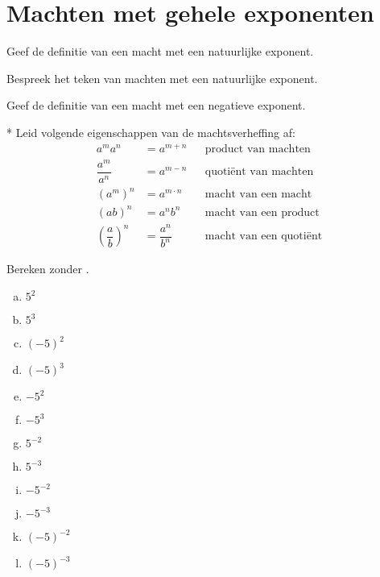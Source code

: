 \documentclass[12pt,twoside]{article}
\begin{document}
\begin{theorie}
  \thispagestyle{empty}
  \mbox{}
  \newpage
  \clearpage
  \thispagestyle{empty}
  \tableofcontents
  \newpage
  \clearpage

  \fancyhead[RE,LO]{}

\end{theorie}

\section{Machten met gehele exponenten}

\begin{oefening}
Geef de definitie van een macht met een natuurlijke exponent.
\end{oefening}

\begin{oefening}
Bespreek het teken van machten met een natuurlijke exponent.
\end{oefening}

\begin{oefening}
Geef de definitie van een macht met een negatieve exponent.
\end{oefening}

\begin{oefening}*
Leid volgende eigenschappen van de machtsverheffing af:
\begin{align*}
  a^m a^n &= a^{m+n} && \mbox{product van machten}\\
  \dfrac{a^m}{a^n} &= a^{m-n} && \mbox{quotiënt van machten}\\
  \left(a^m\right)^n &= a^{m\cdot n} && \mbox{macht van een macht}\\
  \left(ab\right)^n &= a^n b^n && \mbox{macht van een product}\\
  \left(\dfrac{a}{b}\right)^n &= \dfrac{a^n}{b^n} && \mbox{macht van een quotiënt}
\end{align*}
\end{oefening}

\begin{oefening}
Bereken zonder .
\begin{multicols}{4}
  \begin{enumerate}[(a)]
    \itemsep1em
    \item $5^2$
    \item $5^3$
    \item $(-5)^2$
    \item $(-5)^3$
    \item $-5^2$
    \item $-5^3$
    \item $5^{-2}$
    \item $5^{-3}$
    \item $-5^{-2}$
    \item $-5^{-3}$
    \item $(-5)^{-2}$
    \item $(-5)^{-3}$
  \end{enumerate}
\end{multicols}
\end{oefening}
\end{document}
